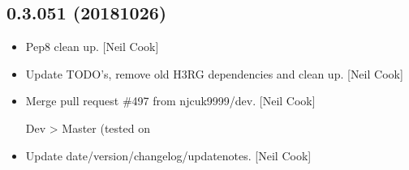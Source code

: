 \documentclass[a4paper,10pt,english]{report}
\begin{document}
\subsection{0.3.051 (2018\sphinxhyphen{}10\sphinxhyphen{}26)}
\label{\detokenize{misc/changelog:id300}}\begin{itemize}
\item {} 
Pep8 clean up. {[}Neil Cook{]}

\item {} 
Update TODO’s, remove old H3RG dependencies and clean up. {[}Neil Cook{]}

\item {} 
Merge pull request \#497 from njcuk9999/dev. {[}Neil Cook{]}

Dev \textendash{}\textgreater{} Master (tested on 

\item {} 
Update date/version/changelog/update\sphinxhyphen{}notes. {[}Neil Cook{]}

\end{itemize}
\end{document}
